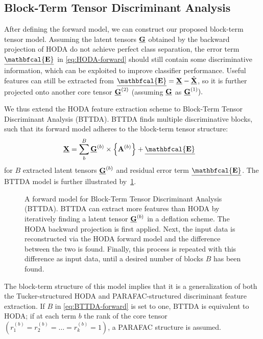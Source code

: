 \subsection{Block-Term Tensor Discriminant Analysis}
After defining the forward model, we can construct our proposed block-term
tensor model.
Assuming the latent tensors $\underline{\mathbf{G}}$
obtained by the backward projection of HODA do not achieve perfect
class separation, the error term $\ten{\mathbfcal{E}}$ in
\cref{eq:HODA-forward} should still contain some discriminative
information, which can be exploited to improve classifier
performance.
Useful features can still be extracted from $\ten{\mathbfcal{E}} = \ten{X} -
\hat{\ten{X}}$, so it is further projected onto another core tensor
$\underline{\mathbf{G}}^{(2)}$ (assuming $\underline{\mathbf{G}}$ as $\underline{\mathbf{G}}^{(1)}).$

We thus extend the HODA feature extraction scheme to Block-Term Tensor Discriminant Analysis
(BTTDA).
BTTDA finds multiple discriminative blocks, such that its forward
model adheres to the block-term tensor structure:
\begin{align}
	\ten{X} & = \sum_b^B\ten{G}^{(b)}\mmpr{\mat{A}^{(b)}} + \ten{\mathbfcal{E}}
	\label{eq:BTTDA-forward}
\end{align}
for $B$ extracted latent tensors $\underline{\mathbf{G}}^{(b)}$ and residual error term
$\ten{\mathbfcal{E}}$.
The BTTDA model is further illustrated by~\cref{fig:BTTDA}.
\begin{figure}[t]
	\centering
	
  \caption[A forward model for \acs{bttda}.]{A forward model for Block-Term Tensor Discriminant Analysis
		(BTTDA). BTTDA can extract more features
		than HODA by iteratively finding a latent tensor $\underline{\mathbf{G}}^{(b)}$ in a
		deflation scheme.
		The HODA backward projection is first applied. Next, the
		input data is reconstructed via the HODA forward model and the
		difference between the two is found.
		Finally, this process is repeated with this difference as input data, until a
		desired number of blocks $B$ has been found.}
	\label{fig:BTTDA}
\end{figure}
The block-term structure of this model implies that it is a generalization of both
the Tucker-structured HODA and PARAFAC-structured discriminant feature
extraction.
If $B$ in \cref{eq:BTTDA-forward} is set to one, BTTDA is equivalent to
HODA; if at each term $b$ the rank of the core tensor
$(r_1^{(b)}=r_2^{(b)}=\ldots=r_k^{(b)}=1)$, a PARAFAC structure is assumed.

